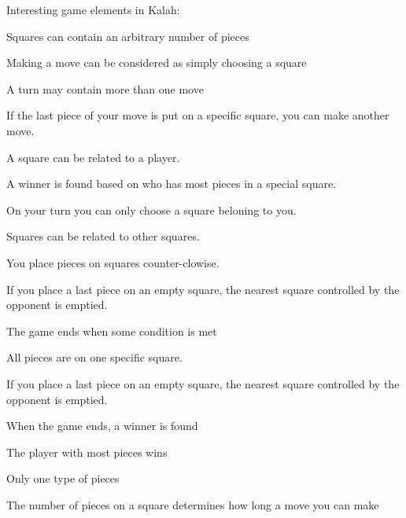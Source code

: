 Interesting game elements in Kalah:
\begin{dlist}
\item Squares can contain an arbitrary number of pieces
\item Making a move can be considered as simply choosing a square
\item A turn may contain more than one move
	\begin{dlist}
	\item If the last piece of your move is put on a specific square, you can make another move.
	\end{dlist}
\item A square can be related to a player.
	\begin{dlist}
	\item A winner is found based on who has most pieces in a special square.
	\item On your turn you can only choose a square beloning to you.
	\end{dlist}
\item Squares can be related to other squares.
	\begin{dlist}
	\item You place pieces on squares counter-clowise.
	\item If you place a last piece on an empty square, the nearest square controlled by the opponent is emptied.
	\end{dlist}
\item The game ends when some condition is met
	\begin{dlist}
	\item All pieces are on one specific square.
	\item If you place a last piece on an empty square, the nearest square controlled by the opponent is emptied.
	\end{dlist}
\item When the game ends, a winner is found
	\begin{dlist}
	\item The player with most pieces wins
	\end{dlist}
\item Only one type of pieces
\item The number of pieces on a square determines how long a move you can make
\end{dlist}
